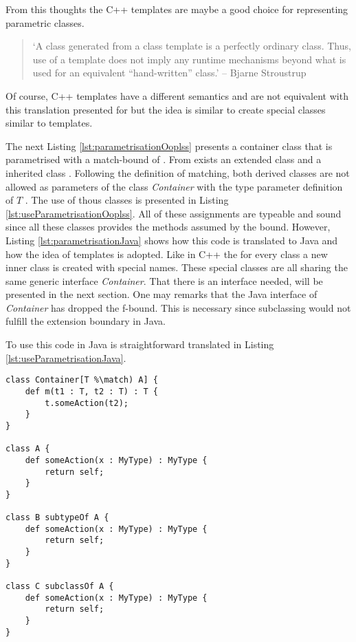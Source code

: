 From this thoughts the C++ templates are maybe a good choice for
representing parametric classes.

\begin{quotation}
`A class generated from a class template is a perfectly ordinary
class. Thus, use of a template does not imply any runtime mechanisms
beyond what is used for an equivalent ``hand-written'' class.' -- Bjarne
Stroustrup \cite{stroustrup_c++_2000}
\end{quotation}

Of course, C++ templates have a different semantics and are not equivalent
with this translation presented for \ooplss but the idea is similar to
create special classes similar to templates.

The next Listing \ref{lst:parametrisationOoplss} presents a container
class that is parametrised with a match-bound of \A. From \A exists an
extended class \B and a inherited class \C. Following the definition
of matching, both derived classes are not allowed as parameters
of the class \emph{Container} with the type parameter definition
of $T$ \match \A.  The use of thous classes is presented in Listing
\ref{lst:useParametrisationOoplss}. All of these assignments are typeable
and sound since all these classes provides the methods assumed by the
bound. However, Listing \ref{lst:parametrisationJava} shows how this code
is translated to Java and how the idea of templates is adopted. Like
in C++ the for every class a new inner class is created with special
names. These special classes are all sharing the same generic interface
\emph{Container}. That there is an interface needed, will be presented
in the next section. One may remarks that the Java interface of
\emph{Container} has dropped the f-bound. This is necessary since
subclassing would not fulfill the extension boundary in Java.

 To use this code in Java is straightforward translated in Listing
\ref{lst:useParametrisationJava}.

\begin{lstlisting}[float,language=ooplss,caption=Parametrisation in \ooplss,label=lst:parametrisationOoplss]
class Container[T %\match) A] {
	def m(t1 : T, t2 : T) : T {
		t.someAction(t2);
	}
}

class A {
	def someAction(x : MyType) : MyType {
		return self;
	}
}

class B subtypeOf A {
	def someAction(x : MyType) : MyType {
		return self;
	}
}

class C subclassOf A {
	def someAction(x : MyType) : MyType {
		return self;
	}
}
\end{lstlisting}

